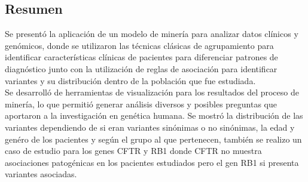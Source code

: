 \subsection*{Resumen}

Se presentó la aplicación de un modelo de minería para analizar datos clínicos y genómicos, donde se utilizaron las técnicas clásicas de  agrupamiento para identificar características clínicas de pacientes para diferenciar patrones de diagnóstico junto con la utilización de reglas de asociación para identificar variantes y su distribución dentro de la población que fue estudiada. \\

Se desarrolló de herramientas de visualización para los resultados del proceso de minería, lo que permitió generar análisis diversos y posibles preguntas que aportaron a la investigación en genética humana. Se mostró la distribución de las variantes dependiendo de si eran variantes sinónimas o no sinónimas, la edad y genéro de los pacientes y según el grupo al que pertenecen, también se realizo un caso de estudio para los genes CFTR y RB1 donde CFTR no muestra asociaciones patogénicas en los pacientes estudiados pero el gen RB1 si presenta variantes asociadas. 




   

